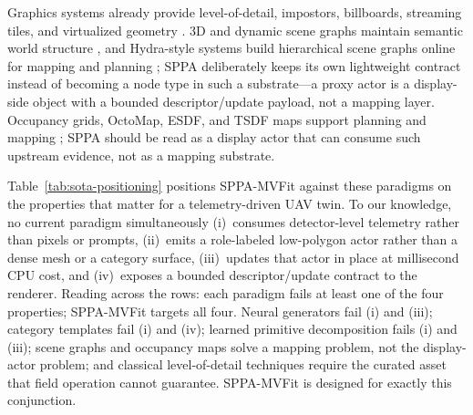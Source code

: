 \documentclass[11pt,a4paper]{article}
\begin{document}
Graphics systems already provide level-of-detail, impostors, billboards,
streaming tiles, and virtualized geometry \cite{clark1976hierarchical,decoret2003billboard,epic2026nanite,ogc2023tiles}.
3D and dynamic scene graphs maintain semantic world structure
\cite{armeni2019scenegraph,rosinol2020dynamic,wu2021scenegraphfusion}, and
Hydra-style systems build hierarchical scene graphs online for mapping and
planning \cite{hughes2022hydra}; SPPA deliberately keeps its own lightweight
contract instead of becoming a node type in such a substrate---a proxy actor
is a display-side object with a bounded descriptor/update payload, not a
mapping layer. Occupancy grids, OctoMap, ESDF, and TSDF maps support
planning and mapping \cite{hornung2013octomap,oleynikova2017voxblox}; SPPA
should be read as a display actor that can consume such upstream evidence,
not as a mapping substrate.

Table~\ref{tab:sota-positioning} positions SPPA-MVFit against these paradigms
on the properties that matter for a telemetry-driven UAV twin. To our
knowledge, no current paradigm simultaneously
(i)~consumes detector-level telemetry rather than pixels or prompts,
(ii)~emits a role-labeled low-polygon actor rather than a dense mesh or a
category surface, (iii)~updates that actor in place at millisecond CPU cost,
and (iv)~exposes a bounded descriptor/update contract to the renderer.
Reading across the rows: each paradigm fails at least one of the four
properties; SPPA-MVFit targets all four. Neural
generators fail (i) and (iii); category templates fail (i) and (iv); learned
primitive decomposition fails (i) and (iii); scene graphs and occupancy maps
solve a mapping problem, not the display-actor problem; and classical
level-of-detail techniques require the curated asset that field operation
cannot guarantee. SPPA-MVFit is designed for exactly this conjunction.
\end{document}
